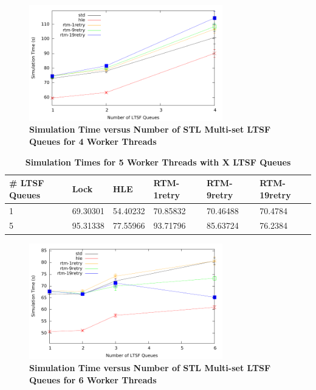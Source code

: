\documentclass[11pt]{book}
\begin{document}
\begin{figure}[H]
    \centering
    \graphicspath{ {./figures/} }
    \includegraphics[width=0.75\textwidth,keepaspectratio]{hugeepidemicsim-XEVENTmig-timeVSschedQs-multiset-4thread}
    \caption{\textbf{Simulation Time versus Number of STL Multi-set LTSF Queues
    for 4 Worker Threads}}
    \label{fig:xThrMig_timeVSschq_4threads}
\end{figure}

\begin{table}[H]
    \centering
    \begin{tabular}{l|p{2cm}|p{2cm}|p{2cm}|p{2cm}|p{2cm}}
        \textbf{\# LTSF Queues}&Lock &HLE &RTM-1retry &RTM-9retry &RTM-19retry \\
        \hline
        \midrule
            1 &69.30301  &54.40232 &70.85832  &70.46488 &70.4784 \\ 
            5 &95.31338  &77.55966 &93.71796  &85.63724 &76.2384 \\
    \end{tabular}
    \caption{\textbf{Simulation Times for 5 Worker Threads with X LTSF Queues}}
    \label{tab:xThrMig_5threadsXschq}
\end{table}

\begin{figure}[H]
    \centering
    \graphicspath{ {./figures/} }
    \includegraphics[width=0.75\textwidth,keepaspectratio]{hugeepidemicsim-XEVENTmig-timeVSschedQs-multiset-6thread}
    \caption{\textbf{Simulation Time versus Number of STL Multi-set LTSF Queues
    for 6 Worker Threads}}
    \label{fig:xThrMig_timeVSschq_6threads}
\end{figure}
\end{document}
